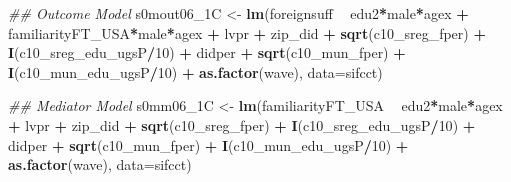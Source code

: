 \documentclass[
]{article}
\newenvironment{Shaded}{\begin{snugshade}}{\end{snugshade}}
\newcommand{\CommentTok}[1]{\textcolor[rgb]{0.56,0.35,0.01}{\textit{#1}}}
\newcommand{\DataTypeTok}[1]{\textcolor[rgb]{0.13,0.29,0.53}{#1}}
\newcommand{\DecValTok}[1]{\textcolor[rgb]{0.00,0.00,0.81}{#1}}
\newcommand{\KeywordTok}[1]{\textcolor[rgb]{0.13,0.29,0.53}{\textbf{#1}}}
\newcommand{\NormalTok}[1]{#1}
\newcommand{\OperatorTok}[1]{\textcolor[rgb]{0.81,0.36,0.00}{\textbf{#1}}}
\newcommand{\StringTok}[1]{\textcolor[rgb]{0.31,0.60,0.02}{#1}}
\begin{document}
\begin{Shaded}
\begin{Highlighting}[]
\CommentTok{## Outcome Model }
\NormalTok{s0mout06_1C <-}\StringTok{ }\KeywordTok{lm}\NormalTok{(foreignsuff  }\OperatorTok{~}\StringTok{ }\NormalTok{edu2}\OperatorTok{*}\NormalTok{male}\OperatorTok{*}\NormalTok{agex }\OperatorTok{+}\StringTok{ }\NormalTok{familiarityFT_USA}\OperatorTok{*}\NormalTok{male}\OperatorTok{*}\NormalTok{agex }\OperatorTok{+}\StringTok{ }\NormalTok{lvpr }\OperatorTok{+}\StringTok{  }
\StringTok{                    }\NormalTok{zip_did }\OperatorTok{+}\StringTok{ }\KeywordTok{sqrt}\NormalTok{(c10_sreg_fper) }\OperatorTok{+}\StringTok{ }\KeywordTok{I}\NormalTok{(c10_sreg_edu_ugsP}\OperatorTok{/}\DecValTok{10}\NormalTok{) }\OperatorTok{+}\StringTok{ }
\StringTok{                    }\NormalTok{didper }\OperatorTok{+}\StringTok{ }\KeywordTok{sqrt}\NormalTok{(c10_mun_fper) }\OperatorTok{+}\StringTok{ }\KeywordTok{I}\NormalTok{(c10_mun_edu_ugsP}\OperatorTok{/}\DecValTok{10}\NormalTok{) }\OperatorTok{+}\StringTok{ }
\StringTok{                    }\KeywordTok{as.factor}\NormalTok{(wave), }\DataTypeTok{data=}\NormalTok{sifcct)}

\CommentTok{## Mediator Model}
\NormalTok{s0mm06_1C <-}\StringTok{ }\KeywordTok{lm}\NormalTok{(familiarityFT_USA  }\OperatorTok{~}\StringTok{ }\NormalTok{edu2}\OperatorTok{*}\NormalTok{male}\OperatorTok{*}\NormalTok{agex }\OperatorTok{+}\StringTok{ }\NormalTok{lvpr }\OperatorTok{+}\StringTok{  }
\StringTok{                  }\NormalTok{zip_did }\OperatorTok{+}\StringTok{ }\KeywordTok{sqrt}\NormalTok{(c10_sreg_fper) }\OperatorTok{+}\StringTok{ }\KeywordTok{I}\NormalTok{(c10_sreg_edu_ugsP}\OperatorTok{/}\DecValTok{10}\NormalTok{) }\OperatorTok{+}\StringTok{ }
\StringTok{                  }\NormalTok{didper }\OperatorTok{+}\StringTok{ }\KeywordTok{sqrt}\NormalTok{(c10_mun_fper) }\OperatorTok{+}\StringTok{ }\KeywordTok{I}\NormalTok{(c10_mun_edu_ugsP}\OperatorTok{/}\DecValTok{10}\NormalTok{) }\OperatorTok{+}\StringTok{ }
\StringTok{                  }\KeywordTok{as.factor}\NormalTok{(wave), }\DataTypeTok{data=}\NormalTok{sifcct)}


\end{Highlighting}
\end{Shaded}
\end{document}
